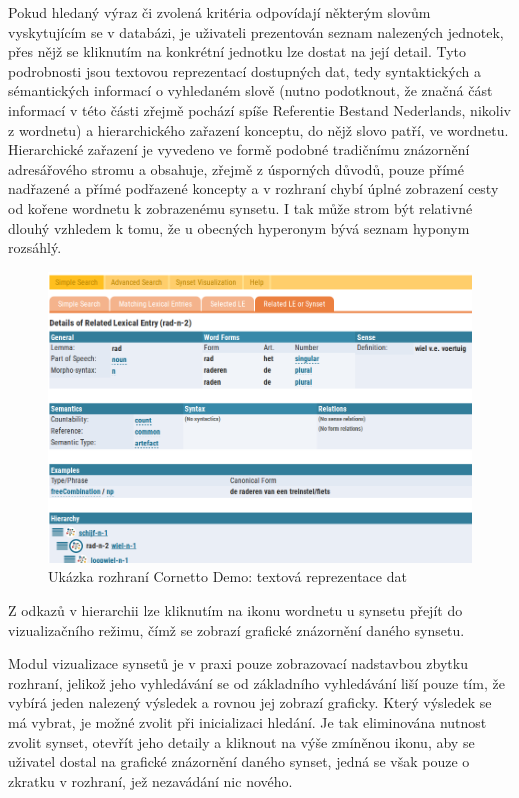\documentclass[a4paper, 11pt, oneside]{book}
\begin{document}
					Pokud hledaný výraz či zvolená kritéria odpovídají některým slovům vyskytujícím se v databázi, je uživateli prezentován seznam nalezených jednotek, přes nějž se kliknutím na konkrétní jednotku lze dostat na její detail. Tyto podrobnosti jsou textovou reprezentací dostupných dat, tedy syntaktických a sémantických informací o vyhledaném slově (nutno podotknout, že značná část informací v této části zřejmě pochází spíše Referentie Bestand Nederlands, nikoliv z wordnetu) a hierarchického zařazení konceptu, do nějž slovo patří, ve wordnetu. Hierarchické zařazení je vyvedeno ve formě podobné tradičnímu znázornění adresářového stromu a obsahuje, zřejmě z úsporných důvodů, pouze přímé nadřazené a přímé podřazené koncepty a v rozhraní chybí úplné zobrazení cesty od kořene wordnetu k zobrazenému synsetu. I tak může strom být relativné dlouhý vzhledem k tomu, že u obecných hyperonym bývá seznam hyponym rozsáhlý. 

					\begin{figure}[h]
						\centering
						\includegraphics[width=1.0\textwidth]{cornetto-text1.png}
						\caption{Ukázka rozhraní Cornetto Demo: textová reprezentace dat}
						\label{fig:cornetto-text1}
					\end{figure}

					Z odkazů v hierarchii lze kliknutím na ikonu wordnetu u synsetu přejít do vizualizačního režimu, čímž se zobrazí grafické znázornění daného synsetu. 

					Modul vizualizace synsetů je v praxi pouze zobrazovací nadstavbou zbytku rozhraní, jelikož jeho vyhledávání se od základního vyhledávání liší pouze tím, že vybírá jeden nalezený výsledek a rovnou jej zobrazí graficky. Který výsledek se má vybrat, je možné zvolit při inicializaci hledání. Je tak eliminována nutnost zvolit synset, otevřít jeho detaily a kliknout na výše zmíněnou ikonu, aby se uživatel dostal na grafické znázornění daného synset, jedná se však pouze o zkratku v rozhraní, jež nezavádání nic nového.
\end{document}
